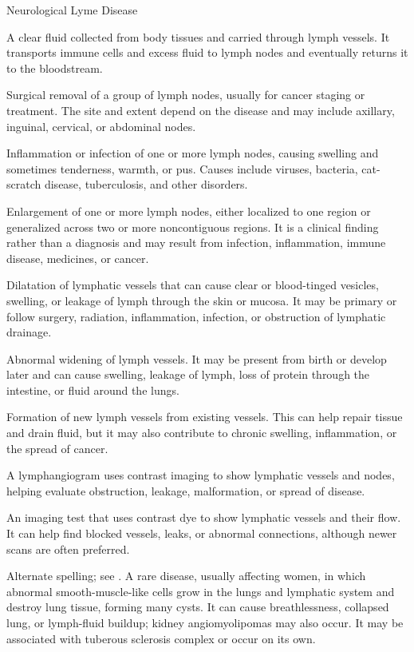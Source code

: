 \synonyms
Neurological Lyme Disease

 A clear fluid collected from body tissues and carried through lymph vessels. It transports immune cells and excess fluid to lymph nodes and eventually returns it to the bloodstream.

 Surgical removal of a group of lymph nodes, usually for cancer staging or treatment. The site and extent depend on the disease and may include axillary, inguinal, cervical, or abdominal nodes.

 Inflammation or infection of one or more lymph nodes, causing swelling and sometimes tenderness, warmth, or pus. Causes include viruses, bacteria, cat-scratch disease, tuberculosis, and other disorders.

 Enlargement of one or more lymph nodes, either localized to one region or generalized across two or more noncontiguous regions. It is a clinical finding rather than a diagnosis and may result from infection, inflammation, immune disease, medicines, or cancer.

 Dilatation of lymphatic vessels that can cause clear or blood-tinged vesicles, swelling, or leakage of lymph through the skin or mucosa. It may be primary or follow surgery, radiation, inflammation, infection, or obstruction of lymphatic drainage.

 Abnormal widening of lymph vessels. It may be present from birth or develop later and can cause swelling, leakage of lymph, loss of protein through the intestine, or fluid around the lungs.

 Formation of new lymph vessels from existing vessels. This can help repair tissue and drain fluid, but it may also contribute to chronic swelling, inflammation, or the spread of cancer.

 A lymphangiogram uses contrast imaging to show lymphatic vessels and nodes, helping evaluate obstruction, leakage, malformation, or spread of disease.

 An imaging test that uses contrast dye to show lymphatic vessels and their flow. It can help find blocked vessels, leaks, or abnormal connections, although newer scans are often preferred.

 Alternate spelling; see .
 A rare disease, usually affecting women, in which abnormal smooth-muscle-like cells grow in the lungs and lymphatic system and destroy lung tissue, forming many cysts. It can cause breathlessness, collapsed lung, or lymph-fluid buildup; kidney angiomyolipomas may also occur. It may be associated with tuberous sclerosis complex or occur on its own.

